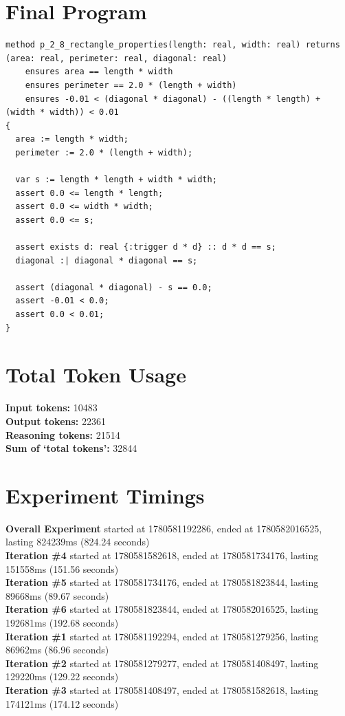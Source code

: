 \documentclass{article}
\begin{document}
\section*{Final Program}
\begin{lstlisting}
method p_2_8_rectangle_properties(length: real, width: real) returns (area: real, perimeter: real, diagonal: real)
	ensures area == length * width
	ensures perimeter == 2.0 * (length + width)
	ensures -0.01 < (diagonal * diagonal) - ((length * length) + (width * width)) < 0.01
{
  area := length * width;
  perimeter := 2.0 * (length + width);

  var s := length * length + width * width;
  assert 0.0 <= length * length;
  assert 0.0 <= width * width;
  assert 0.0 <= s;

  assert exists d: real {:trigger d * d} :: d * d == s;
  diagonal :| diagonal * diagonal == s;

  assert (diagonal * diagonal) - s == 0.0;
  assert -0.01 < 0.0;
  assert 0.0 < 0.01;
}
\end{lstlisting}
\section*{Total Token Usage}
\textbf{Input tokens: }10483
\\\textbf{Output tokens: }22361
\\\textbf{Reasoning tokens: }21514
\\\textbf{Sum of `total tokens': }32844
\section*{Experiment Timings}
\textbf{Overall Experiment} started at 1780581192286, ended at 1780582016525, lasting 824239ms (824.24 seconds)
\\\textbf{Iteration \#4} started at 1780581582618, ended at 1780581734176, lasting 151558ms (151.56 seconds)
\\\textbf{Iteration \#5} started at 1780581734176, ended at 1780581823844, lasting 89668ms (89.67 seconds)
\\\textbf{Iteration \#6} started at 1780581823844, ended at 1780582016525, lasting 192681ms (192.68 seconds)
\\\textbf{Iteration \#1} started at 1780581192294, ended at 1780581279256, lasting 86962ms (86.96 seconds)
\\\textbf{Iteration \#2} started at 1780581279277, ended at 1780581408497, lasting 129220ms (129.22 seconds)
\\\textbf{Iteration \#3} started at 1780581408497, ended at 1780581582618, lasting 174121ms (174.12 seconds)
\end{document}
